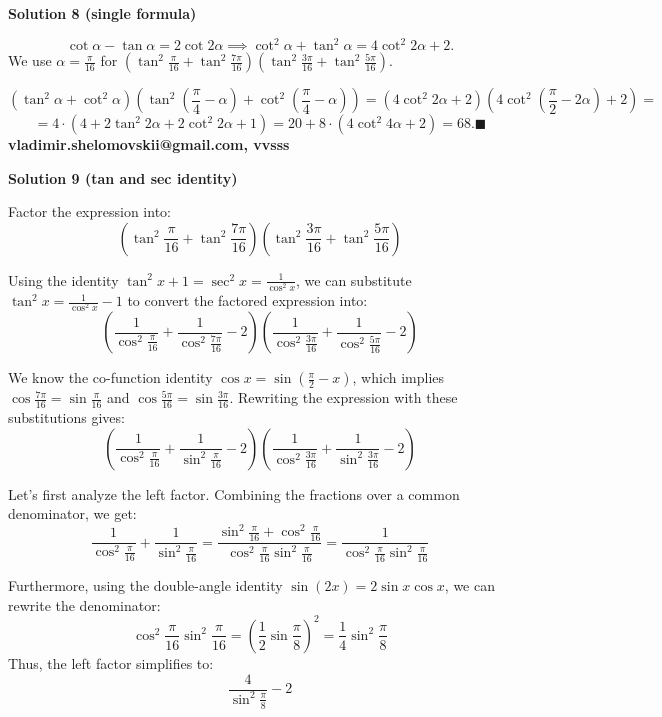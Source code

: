 \begin{enumerate}
\textbf{Solution 8 (single formula)}


 \[\cot \alpha - \tan \alpha = 2 \cot 2 \alpha \implies \cot^2 \alpha + \tan^2 \alpha = 4 \cot^2 2 \alpha + 2.\] We use $\alpha = \frac {\pi}{16}$ for $(\tan^2\frac{\pi}{16}+\tan^2 \frac{7\pi}{16})(\tan^2\frac{3\pi}{16}+\tan^2 \frac{5\pi}{16}).$

 \[(\tan^2 \alpha + \cot^2 \alpha)(\tan^2 (\frac{\pi}{4} - \alpha) + \cot^2 (\frac{\pi}{4} - \alpha)) = (4 \cot^2 2 \alpha + 2)(4 \cot^2 (\frac{\pi}{2} - 2\alpha) +2) =\]
 \[= 4 \cdot(4+ 2\tan^2 2\alpha + 2\cot^2 2\alpha +1) = 20 + 8 \cdot (4 \cot^2 4 \alpha +2) = 68.\blacksquare\]\textbf{vladimir.shelomovskii@gmail.com, vvsss}

 



\textbf{Solution 9 (tan and sec identity)}

Factor the expression into:
 \[\left(\tan^2 \frac{\pi}{16} + \tan^2 \frac{7\pi}{16}\right)\left(\tan^2 \frac{3\pi}{16} + \tan^2 \frac{5\pi}{16}\right)\]

 Using the identity $\tan^2 x + 1 = \sec^2 x = \frac{1}{\cos^2 x}$, we can substitute $\tan^2 x = \frac{1}{\cos^2 x} - 1$ to convert the factored expression into:
 \[\left(\frac{1}{\cos^2 \frac{\pi}{16}} + \frac{1}{\cos^2 \frac{7\pi}{16}} - 2\right)\left(\frac{1}{\cos^2 \frac{3\pi}{16}} + \frac{1}{\cos^2 \frac{5\pi}{16}} - 2\right)\]

 We know the co-function identity $\cos x = \sin\left(\frac{\pi}{2} - x\right)$, which implies $\cos \frac{7\pi}{16} = \sin \frac{\pi}{16}$ and $\cos \frac{5\pi}{16} = \sin \frac{3\pi}{16}$. Rewriting the expression with these substitutions gives:
 \[\left(\frac{1}{\cos^2 \frac{\pi}{16}} + \frac{1}{\sin^2 \frac{\pi}{16}} - 2\right)\left(\frac{1}{\cos^2 \frac{3\pi}{16}} + \frac{1}{\sin^2 \frac{3\pi}{16}} - 2\right)\]

 Let’s first analyze the left factor. Combining the fractions over a common denominator, we get:
 \[\frac{1}{\cos^2 \frac{\pi}{16}} + \frac{1}{\sin^2 \frac{\pi}{16}} = \frac{\sin^2 \frac{\pi}{16} + \cos^2 \frac{\pi}{16}}{\cos^2 \frac{\pi}{16}\sin^2 \frac{\pi}{16}} = \frac{1}{\cos^2 \frac{\pi}{16}\sin^2 \frac{\pi}{16}}\]

 Furthermore, using the double-angle identity $\sin(2x) = 2\sin x \cos x$, we can rewrite the denominator:
 \[\cos^2 \frac{\pi}{16}\sin^2 \frac{\pi}{16} = \left(\frac{1}{2}\sin \frac{\pi}{8}\right)^2 = \frac{1}{4}\sin^2 \frac{\pi}{8}\]Thus, the left factor simplifies to:
 \[\frac{4}{\sin^2 \frac{\pi}{8}} - 2\]


\end{enumerate}
